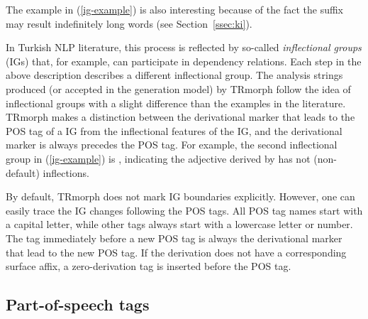 \documentclass[twocolumn]{article}
\begin{document}
The example in (\ref{ig-example}) is also interesting because of the fact the suffix  may result indefinitely long words (see Section~\ref{ssec:ki}).


In Turkish NLP literature, this process is reflected by so-called \emph{inflectional groups} (IGs) that,
for example, can participate in dependency relations.
Each step in the above description describes a different inflectional group.
The analysis strings produced (or accepted in the generation model) by TRmorph follow the idea of inflectional groups with a slight difference than the examples in the literature.
TRmorph makes a distinction between the derivational marker that leads to the POS tag of a IG from the inflectional features of the IG,  
and the derivational marker is always precedes the POS tag.
For example, the second inflectional group in (\ref{ig-example}) is ,
indicating the adjective derived by  has not (non-default) inflections.

By default, TRmorph does not mark IG boundaries explicitly. 
However, one can easily trace the IG changes following the POS tags. 
All POS tag names start with a capital letter, 
while other tags always start with a lowercase letter or number. 
The tag immediately before a new POS tag is always the derivational marker that lead to the new POS tag.
If the derivation does not have a corresponding surface affix, 
a zero-derivation tag  is inserted before the POS tag.

\subsection{Part-of-speech tags}
\end{document}
